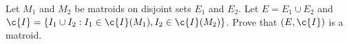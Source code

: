 \prob
{
    Let $M_1$ and $M_2$ be matroids on disjoint sets $E_1$ and $E_2$. Let $E = E_1 \cup E_2$ and 
    $\c{I} = \{ I_1 \cup I_2 : I_1 \in \c{I}(M_1), I_2 \in \c{I}(M_2)\}$. Prove that $(E, \c{I})$ is a
    matroid.
}